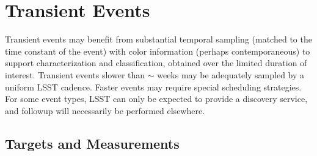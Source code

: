 
%
%
%
%
%
%

\section{Transient Events}
\label{sec:keyword} %



Transient events may benefit from substantial temporal sampling (matched to the time constant of the
event) with color information (perhaps contemporaneous) to support characterization and classification, obtained over the limited duration of interest.  Transient events slower than $\sim$ weeks may be adequately sampled by a uniform LSST cadence.  Faster events may require special scheduling strategies.  For some event types, LSST can only be expected to provide a discovery service, and followup will necessarily be performed elsewhere.



\subsection{Targets and Measurements}
\label{sec:keyword:targets}

